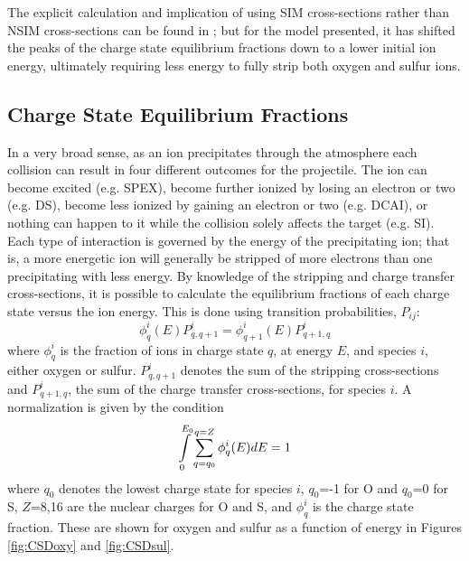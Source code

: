 \documentclass[draft]{agujournal2018}
\begin{document}
The explicit calculation and implication of using SIM cross-sections rather than NSIM cross-sections can be found in \citet{schultz2018}; but for the model presented, it has shifted the peaks of the charge state equilibrium fractions down to a lower initial ion energy, ultimately requiring less energy to fully strip both oxygen and sulfur ions.

\subsection{Charge State Equilibrium Fractions}

In a very broad sense, as an ion precipitates through the atmosphere each collision can result in four different outcomes for the projectile.
The ion can become excited (e.g. SPEX), become further ionized by losing an electron or two (e.g. DS), become less ionized by gaining an electron or two (e.g. DCAI), or nothing can happen to it while the collision solely affects the target (e.g. SI).
Each type of interaction is governed by the energy of the precipitating ion; that is, a more energetic ion will generally be stripped of more electrons than one precipitating with less energy.
By knowledge of the stripping and charge transfer cross-sections, it is possible to calculate the equilibrium fractions of each charge state versus the ion energy.
This is done using transition probabilities, $P_{ij}$:
\begin{equation}
    \phi_{q}^{i}(E) P^i_{q,q+1}=\phi_{q+1}^{i}(E) P^i_{q+1,q}
    \label{eqn:EqProb}
\end{equation}
where $\phi_q^i$ is the fraction of ions in charge state $q$, at energy $E$, and species $i$, either oxygen or sulfur.
$P^i_{q,q+1}$ denotes the sum of the stripping cross-sections and $P^i_{q+1,q}$, the sum of the charge transfer cross-sections, for species $i$.
A normalization is given by the condition
\begin{equation}
    \int\displaylimits_{0}^{E_0}\sum_{q=q_0}^{q=Z}\phi^i_q(E)dE=1
    \label{eqn:EqProbNorm}
\end{equation}
where $q_0$ denotes the lowest charge state for species $i$, $q_0$=-1 for O and $q_0$=0 for S, $Z$=8,16 are the nuclear charges for O and S, and $\phi_q^i$ is the charge state fraction.
These are shown for oxygen and sulfur as a function of energy in Figures \ref{fig:CSDoxy} and \ref{fig:CSDsul}.
\end{document}
